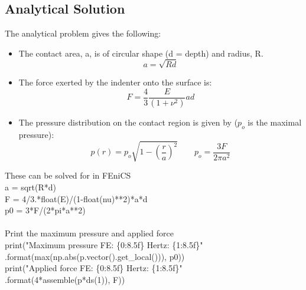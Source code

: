 \documentclass[12pt,3p]{article}
\begin{document}
\subsection{Analytical Solution}
The analytical problem gives the following: 
\begin{itemize}
\item The contact area, a, is of circular shape (d = depth) and radius, R.
	\begin{equation*}
	a = \sqrt{Rd}
	\end{equation*}
\item The force exerted by the indenter onto the surface is:
	\begin{equation*}
	F = \frac{4}{3} \frac{E}{(1+ \nu^2)} ad
	\end{equation*}
\item The pressure distribution on the contact region is given by ($p_o$ is the maximal pressure):
	\begin{equation*}
	p(r) = p_o \sqrt{1 - (\frac{r}{a})^2} \quad \quad p_o = \frac{3F}{2 \pi a^2}
	\end{equation*}
\end{itemize}
These can be solved for in FEniCS \\
{\selectfont
a = sqrt(R*d) \\
F = 4/3.*float(E)/(1-float(nu)**2)*a*d \\
p0 = 3*F/(2*pi*a**2) \\ \\
}
Print the maximum pressure and applied force \\
{\selectfont
print("Maximum pressure FE: \{0:8.5f\} Hertz: \{1:8.5f\}" \\
\indent \indent.format(max(np.abs(p.vector().get\_local())), p0)) \\
print("Applied force FE: \{0:8.5f\} Hertz: \{1:8.5f\}" \\
\indent \indent .format(4*assemble(p*ds(1)), F)) \\ \\
}

\end{document}
